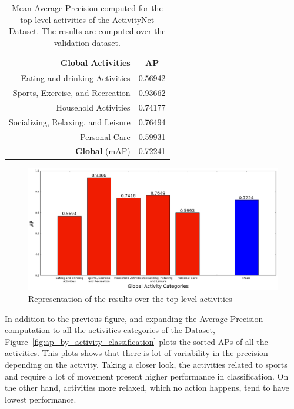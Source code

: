 \begin{table}[H]
\begin{center}
\begin{tabular}{|r|c|}
\hline
\textbf{Global Activities} & \textbf{AP} \\
\hline\hline
Eating and drinking Activities & 0.56942 \\
Sports, Exercise, and Recreation & 0.93662 \\
Household Activities & 0.74177 \\
Socializing, Relaxing, and Leisure & 0.76494 \\
Personal Care & 0.59931 \\
\hline\hline
\textbf{Global} (mAP) & 0.72241 \\
\hline
\end{tabular}
\end{center}
\caption{Mean Average Precision computed for the top level activities of the ActivityNet Dataset. The results are computed over the validation dataset.}
\label{table:top_level_classification_ap}
\end{table}

\begin{figure}[H]
\begin{center}
\includegraphics[width=1\linewidth]{img/results/top_activities_classification_ap}
\end{center}
\caption{Representation of the results over the top-level activities}
\label{fig:top_level_classification_ap}
\end{figure}

In addition to the previous figure, and expanding the Average Precision computation to all the activities categories of the Dataset, Figure~\ref{fig:ap_by_activity_classification} plots the sorted APs of all the activities. This plots shows that there is lot of variability in the precision depending on the activity. Taking a closer look, the activities related to sports and require a lot of movement present higher performance in classification. On the other hand, activities more relaxed, which no action happens, tend to have lowest performance.

